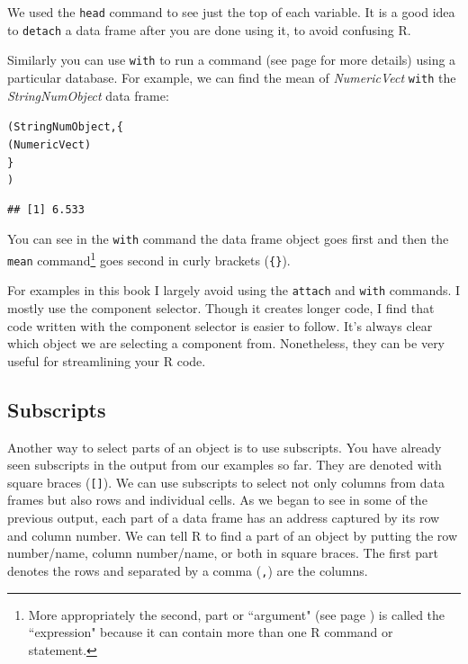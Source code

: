 \documentclass[krantz1]{krantz}
\begin{document}
\noindent We used the \texttt{head} command to see just the top of each variable. It is a good idea to \texttt{detach} a data frame after you are done using it, to avoid confusing R. 

Similarly you can use \texttt{with} to run a command (see page \pageref{FunctionsCommands} for more details) using a particular database. For example, we can find the mean of \emph{NumericVect} \texttt{with} the \emph{StringNumObject} data frame:

\begin{knitrout}
\color{fgcolor}\begin{kframe}
\begin{alltt}
(StringNumObject, \{
    (NumericVect)
    \}
)
\end{alltt}
\begin{verbatim}
## [1] 6.533
\end{verbatim}
\end{kframe}
\end{knitrout}


\noindent You can see in the \texttt{with} command the data frame object goes first and then the \texttt{mean} command\footnote{More appropriately the second, part or ``argument" (see page \pageref{arguments}) is called the ``expression" because it can contain more than one R command or statement.} goes second in curly brackets (\verb|{}|).

For examples in this book I largely avoid using the \texttt{attach} and \texttt{with} commands. I mostly use the component selector. Though it creates longer code, I find that code written with the component selector is easier to follow. It's always clear which object we are selecting a component from. Nonetheless, they can be very useful for streamlining your R code.

\subsection{Subscripts}

Another way to select parts of an object is to use subscripts. You have already seen subscripts in the output from our examples so far. They are denoted with square braces (\texttt{[]}). We can use subscripts to select not only columns from data frames but also rows and individual cells. As we began to see in some of the previous output, each part of a data frame has an address captured by its row and column number. We can tell R to find a part of an object by putting the row number/name, column number/name, or both in square braces. The first part denotes the rows and separated by a comma (\texttt{,}) are the columns. 
\end{document}
